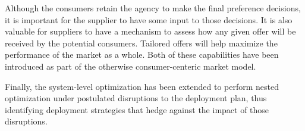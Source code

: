 Although the consumers retain the agency to make the final preference
decisions, it is important for the supplier to have some input to those
decisions.  It is also valuable for suppliers to have a mechanism to assess
how any given offer will be received by the potential consumers.  Tailored
offers will help maximize the performance of the market as a whole.  Both of
these capabilities have been introduced as part of the otherwise
consumer-centeric market model.

Finally, the system-level optimization has been extended to perform nested
optimization under postulated disruptions to the deployment plan, thus
identifying deployment strategies that hedge against the impact of those
disruptions.



